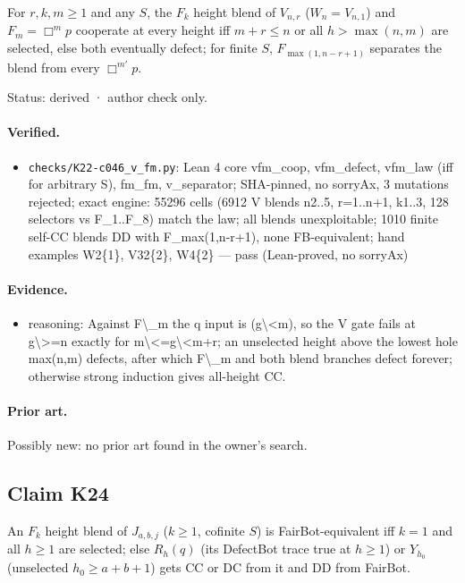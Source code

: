 \documentclass{article}
\begin{document}
For $r,k,m\ge1$ and any $S$, the $F_k$ height blend of $V_{n,r}$ ($W_n=V_{n,1}$) and $F_m=\Box^mp$ cooperate at every height iff $m+r\le n$ or all $h>\max(n,m)$ are selected, else both eventually defect; for finite $S$, $F_{\max(1,n-r+1)}$ separates the blend from every $\Box^{m'}p$.

Status: derived · author check only.

\paragraph{Verified.}
\begin{itemize}
\item \texttt{checks/K22-c046\_v\_fm.py}: Lean 4 core vfm\_coop, vfm\_defect, vfm\_law (iff for arbitrary S), fm\_fm, v\_separator; SHA-pinned, no sorryAx, 3 mutations rejected; exact engine: 55296 cells (6912 V blends n2..5, r=1..n+1, k1..3, 128 selectors vs F\_1..F\_8) match the law; all blends unexploitable; 1010 finite self-CC blends DD with F\_max(1,n-r+1), none FB-equivalent; hand examples W2\{1\}, V32\{2\}, W4\{2\} --- pass (Lean-proved, no sorryAx)
\end{itemize}

\paragraph{Evidence.}
\begin{itemize}
\item reasoning: Against F\textbackslash{}\_m the q input is (g\textbackslash{}\textless{}m), so the V gate fails at g\textbackslash{}\textgreater{}=n exactly for m\textbackslash{}\textless{}=g\textbackslash{}\textless{}m+r; an unselected height above the lowest hole max(n,m) defects, after which F\textbackslash{}\_m and both blend branches defect forever; otherwise strong induction gives all-height CC.
\end{itemize}

\paragraph{Prior art.} Possibly new: no prior art found in the owner's search.

\subsection*{Claim K24}

An $F_k$ height blend of $J_{a,b,j}$ ($k\ge1$, cofinite $S$) is FairBot-equivalent iff $k=1$ and all $h\ge1$ are selected; else $R_h(q)$ (its DefectBot trace true at $h\ge1$) or $Y_{h_0}$ (unselected $h_0\ge a+b+1$) gets CC or DC from it and DD from FairBot.
\end{document}
